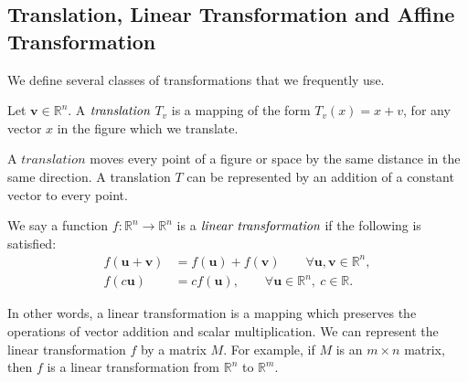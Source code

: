    \subsection{Translation, Linear Transformation and Affine Transformation}
      
      We define several classes of transformations that we frequently use.
      
      \begin{definition*}
         Let $\textbf{v}\in\mathbb{R}^n$. A $\emph{translation}$ ${T}_v$ is a mapping of the form ${T}_v (x) = x + v$, for any vector $x$ in the figure which we translate.
      \end{definition*}
      A $\textit{translation}$ moves every point of a figure or space by the same distance in the same direction. A translation ${T}$ can be represented by an addition of a constant vector to every point.


      \begin{definition*}
      We say a function $\mathit{f}: \mathbb R^n \rightarrow\mathbb R^n$ is a $\emph{linear transformation}$ if the following is satisfied:
      \begin{align*}
      \mathit{f}(\textbf{u} + \textbf{v}) &= \mathit{f}(\textbf{u}) + \mathit{f}(\textbf{v}) \qquad \forall \textbf{u}, \textbf{v} \in\mathbb{R}^n,\\
      \mathit{f}(c\textbf{u}) &= c\mathit{f}(\textbf{u}), \qquad \forall \textbf{u} \in\mathbb R^n, ~c\in\mathbb R.
      \end{align*}
      \end{definition*}
      In other words, a linear transformation is a mapping which preserves the operations of vector addition and scalar multiplication. We can represent the linear transformation ${f}$ by a matrix ${M}$. For example, if ${M}$ is an ${m} \times {n}$ matrix, then ${f}$ is a linear transformation from $\mathbb{R}^n$ to $\mathbb{R}^m$. 


